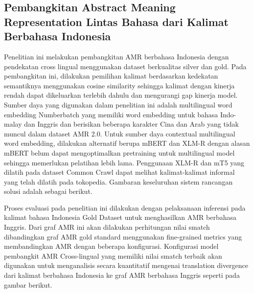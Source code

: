 \subsection{Pembangkitan Abstract Meaning Representation Lintas Bahasa dari Kalimat Berbahasa Indonesia }

Penelitian ini melakukan pembangkitan AMR berbahasa Indonesia dengan pendekatan cross lingual menggunakan dataset berkualitas silver dan gold.
Pada pembangkitan ini, dilakukan pemilihan kalimat berdasarkan kedekatan semantiknya menggunakan cosine similarity sehingga kalimat dengan kinerja rendah dapat dikeluarkan terlebih dahulu dan mengurangi gap kinerja model.
Sumber daya yang digunakan dalam penelitian ini adalah multilingual word embedding Numberbatch yang memiliki word embedding untuk bahasa Indo-malay dan Inggris dan berisikan beberapa karakter Cina dan Arab yang tidak muncul dalam dataset AMR 2.0.
Untuk sumber daya contextual multilingual word embedding, dilakukan alternatif berupa mBERT dan XLM-R dengan alasan mBERT belum dapat mengoptimalkan pretraining untuk multilingual model sehingga memerlukan pelatihan lebih lama.
Penggunaan XLM-R dan mT5 yang dilatih pada dataset Common Crawl dapat melihat kalimat-kalimat informal yang telah dilatih pada tokopedia.
Gambaran keseluruhan sistem rancangan solusi adalah sebagai berikut.

Proses evaluasi pada penelitian ini dilakukan dengan pelaksanaan inferensi pada kalimat bahasa Indonesia Gold Dataset untuk menghasilkan AMR berbahasa Inggris.
Dari graf AMR ini akan dilakukan perhitungan nilai smatch dibandingkan graf AMR gold standard menggunakan fine-grained metrics yang membandingkan AMR dengan beberapa konfigurasi.
Konfigurasi model pembangkit AMR Cross-lingual yang memiliki nilai smatch terbaik akan digunakan untuk menganalisis secara kuantitatif mengenai translation divergence dari kalimat berbahasa Indonesia ke graf AMR berbahasa Inggris seperti pada gambar berikut.

